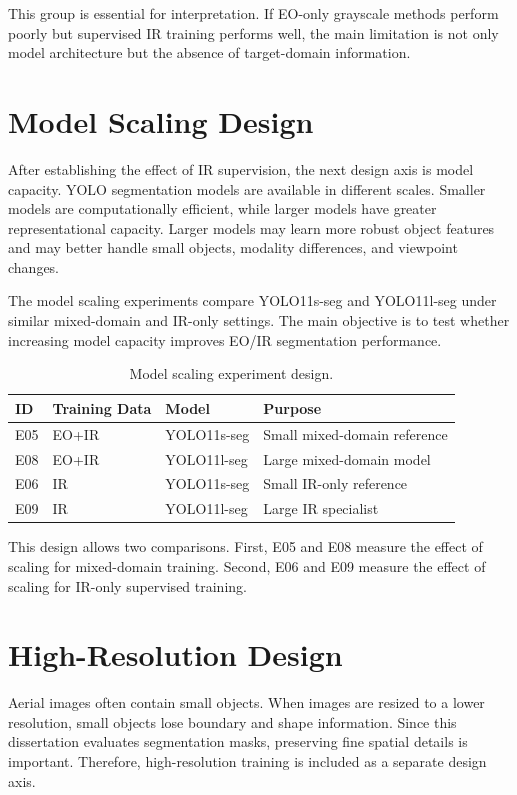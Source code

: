 This group is essential for interpretation. If EO-only grayscale methods perform poorly but supervised IR training performs well, the main limitation is not only model architecture but the absence of target-domain information.

\section{Model Scaling Design}

After establishing the effect of IR supervision, the next design axis is model capacity. YOLO segmentation models are available in different scales. Smaller models are computationally efficient, while larger models have greater representational capacity. Larger models may learn more robust object features and may better handle small objects, modality differences, and viewpoint changes.

The model scaling experiments compare YOLO11s-seg and YOLO11l-seg under similar mixed-domain and IR-only settings. The main objective is to test whether increasing model capacity improves EO/IR segmentation performance.

\begin{table}[h]
\centering
\caption{Model scaling experiment design.}
\label{tab:model_scaling}
\begin{tabular}{llll}
\hline
\textbf{ID} & \textbf{Training Data} & \textbf{Model} & \textbf{Purpose} \\
\hline
E05 & EO+IR & YOLO11s-seg & Small mixed-domain reference \\
E08 & EO+IR & YOLO11l-seg & Large mixed-domain model \\
E06 & IR & YOLO11s-seg & Small IR-only reference \\
E09 & IR & YOLO11l-seg & Large IR specialist \\
\hline
\end{tabular}
\end{table}

This design allows two comparisons. First, E05 and E08 measure the effect of scaling for mixed-domain training. Second, E06 and E09 measure the effect of scaling for IR-only supervised training.

\section{High-Resolution Design}

Aerial images often contain small objects. When images are resized to a lower resolution, small objects lose boundary and shape information. Since this dissertation evaluates segmentation masks, preserving fine spatial details is important. Therefore, high-resolution training is included as a separate design axis.

